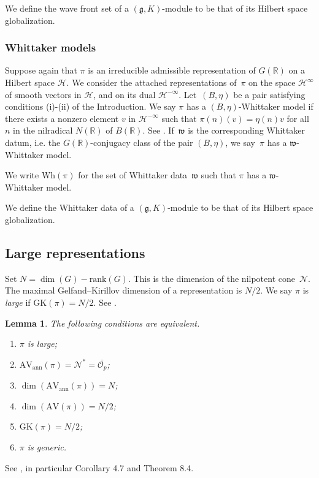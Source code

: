 \documentclass[10pt,leqno]{article}
\newtheorem{lemma}[equation]{Lemma}
\numberwithin{equation}{section}
\newcommand{\mH}{\mathcal H}
\renewcommand{\O}{\mathcal O}
\newcommand{\R}{\mathbb R}
\newcommand{\N}{\mathcal N}
\newcommand{\g}{\mathfrak g}
\newcommand{\w}{\mathfrak w}
\newcommand{\AV}{\mathrm{AV}}
\newcommand{\Wh}{\mathrm{Wh}}
\newcommand{\AVann}{\mathrm{AV}_{\mathrm{ann}}}
\newcommand{\GK}{\mathrm{GK}}
\newcommand{\Op}{\O_p}
\begin{document}
We define the wave front set of a $(\g,K)$-module to be that of its 
Hilbert space globalization.

\subsubsection*{Whittaker models}

Suppose again that $\pi$ is an irreducible admissible representation of $G(\R)$ on a Hilbert space $\mH$. We consider the attached representations of~$\pi$ on the space $\mH^\infty$ of smooth vectors in $\mH$, and on its dual $\mH^{-\infty}$. Let~$(B, \eta)$ be a pair satisfying conditions (i)-(ii) of the Introduction. We say $\pi$ has a $(B,\eta)$-Whittaker model
if there exists a nonzero element $v$ in $\mH^{-\infty}$ such that $\pi(n)(v)=\eta(n)v$ for all $n$ in the nilradical $N(\R)$ of $B(\R)$. See \cite{matumoto}. If~$\w$ is the corresponding Whittaker datum, i.e. the $G(\R)$-conjugacy class of the pair $(B, \eta)$, we say~$\pi$ has a $\w$-Whittaker model.  

We write $\Wh(\pi)$ for the set of Whittaker data~$\w$ such that $\pi$ has a $\w$-Whittaker model.

We define the Whittaker data  of a $(\g,K)$-module to be that of its 
Hilbert space globalization.


\subsection{Large representations} Set $N=\dim(G)-\mathrm{rank}(G)$. This is the dimension of the nilpotent cone~$\N$. The maximal Gelfand--Kirillov dimension of a representation is $N/2$.
We say $\pi$ is {\it large} if $\GK(\pi)=N/2$. See \cite[Section~6]{vogan-gelfand-kirillov}. 


\begin{lemma}
  \label{l:large}
  The following conditions are equivalent.
  \begin{enumerate}
    \item $\pi$ is large;
\item $\AVann(\pi)=\N^*=\overline{\Op}$;
\item $\dim(\AVann(\pi))=N$;
  \item $\dim(\AV(\pi))=N/2$;
  \item $\GK(\pi)=N/2$;
    \item $\pi$ is generic.

\end{enumerate}
\end{lemma}
See \cite{vogan_bowdoin}, in particular Corollary 4.7 and Theorem 8.4.
\end{document}
